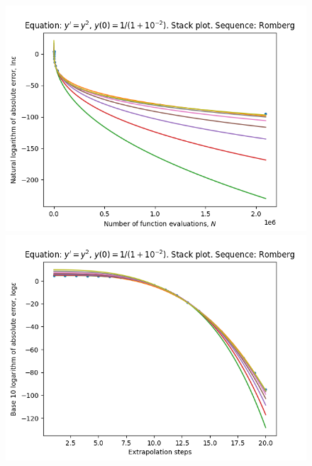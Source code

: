 \begin{figure}[H]
\centering
\begin{minipage}{0.45\textwidth}
\centering
\includegraphics[scale=0.45]{emr_plots/singularity_2_hp_romberg_stack.png}
\end{minipage}
\begin{minipage}{0.45\textwidth}
\centering
\includegraphics[scale=0.45]{emr_plots/singularity_2_hp_romberg_steps_stack.png}
\end{minipage}
\end{figure}

